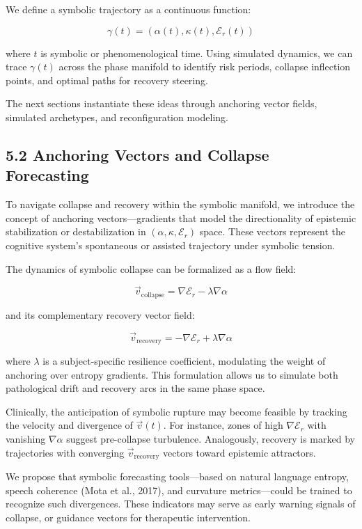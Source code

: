 We define a symbolic trajectory as a continuous function:

\[
\gamma(t) = (\alpha(t), \kappa(t), \mathcal{E}_r(t))
\]

where $t$ is symbolic or phenomenological time. Using simulated dynamics, we can trace $\gamma(t)$ across the phase manifold to identify risk periods, collapse inflection points, and optimal paths for recovery steering.

The next sections instantiate these ideas through anchoring vector fields, simulated archetypes, and reconfiguration modeling.
\subsection*{5.2 Anchoring Vectors and Collapse Forecasting}

To navigate collapse and recovery within the symbolic manifold, we introduce the concept of anchoring vectors—gradients that model the directionality of epistemic stabilization or destabilization in $(\alpha, \kappa, \mathcal{E}_r)$ space. These vectors represent the cognitive system's spontaneous or assisted trajectory under symbolic tension.

The dynamics of symbolic collapse can be formalized as a flow field:

\[
\vec{v}_{\text{collapse}} = \nabla \mathcal{E}_r - \lambda \nabla \alpha
\]

and its complementary recovery vector field:

\[
\vec{v}_{\text{recovery}} = -\nabla \mathcal{E}_r + \lambda \nabla \alpha
\]

where $\lambda$ is a subject-specific resilience coefficient, modulating the weight of anchoring over entropy gradients. This formulation allows us to simulate both pathological drift and recovery arcs in the same phase space.

Clinically, the anticipation of symbolic rupture may become feasible by tracking the velocity and divergence of $\vec{v}(t)$. For instance, zones of high $\nabla \mathcal{E}_r$ with vanishing $\nabla \alpha$ suggest pre-collapse turbulence. Analogously, recovery is marked by trajectories with converging $\vec{v}_{\text{recovery}}$ vectors toward epistemic attractors.

We propose that symbolic forecasting tools—based on natural language entropy, speech coherence (Mota et al., 2017\cite{Mota2017}), and curvature metrics—could be trained to recognize such divergences. These indicators may serve as early warning signals of collapse, or guidance vectors for therapeutic intervention.

